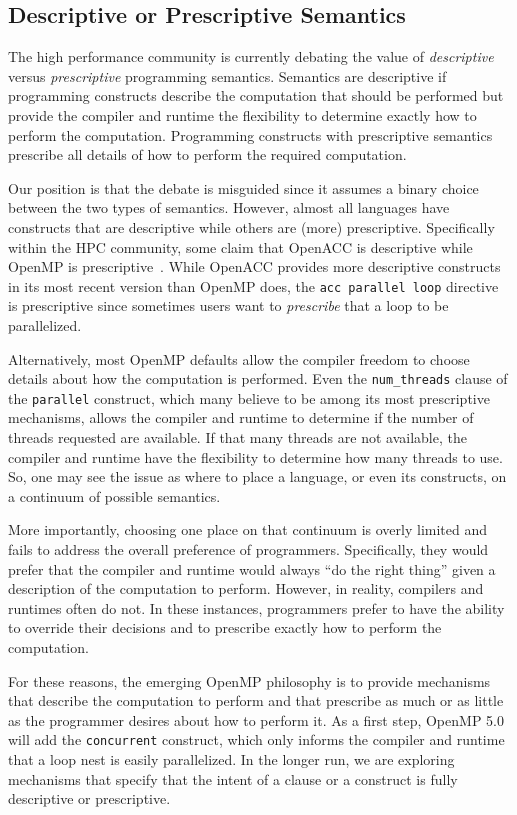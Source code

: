 \subsection{Descriptive or Prescriptive Semantics}
\label{sub:descriptive}

The high performance community is currently debating the value of 
\emph{descriptive} versus \emph{prescriptive} programming semantics. 
Semantics are descriptive if programming constructs describe the 
computation that should be performed but provide the compiler and 
runtime the flexibility to determine exactly how to perform the 
computation. Programming constructs with prescriptive semantics 
prescribe all details of how to perform the required computation.

Our position is that the debate is misguided since it assumes a binary 
choice between the two types of semantics. However, almost all languages 
have constructs that are descriptive while others are (more) prescriptive. 
Specifically within the HPC community, some claim that OpenACC is descriptive 
while OpenMP is prescriptive~\cite{juckeland2016isc,wolfe16descriptive}. 
While OpenACC provides more descriptive constructs in its most recent version 
than OpenMP does, the \texttt{acc parallel loop} directive is prescriptive 
since sometimes users want to \emph{prescribe} that a loop to be parallelized. 

Alternatively, most OpenMP defaults allow the compiler freedom
to choose details about how the computation is performed. Even
the \texttt{num\_threads} clause of the \texttt{parallel} construct,
which many believe to be among its most prescriptive mechanisms,
allows the compiler and runtime to determine if the number of
threads requested are available. If that many threads are not
available, the compiler and runtime have the flexibility to
determine how many threads to use. So, one may see the issue 
as where to place a language, or even its constructs, on a 
continuum of possible semantics.

More importantly, choosing one place on that continuum is overly
limited and fails to address the overall preference of programmers. 
Specifically, they would prefer that the compiler and runtime would 
always ``do the right thing'' given a description of the computation 
to perform. However, in reality, compilers and runtimes often do not. 
In these instances, programmers prefer to have the ability to override 
their decisions and to prescribe exactly how to perform the computation.

For these reasons, the emerging OpenMP philosophy is to provide
mechanisms that describe the computation to perform and that
prescribe as much or as little as the programmer desires about
how to perform it. As a first step, OpenMP 5.0 will add the 
\texttt{concurrent} construct, which only informs the compiler 
and runtime that a loop nest is easily parallelized. In the 
longer run, we are exploring mechanisms that specify that the 
intent of a clause or a construct is fully descriptive or prescriptive.
